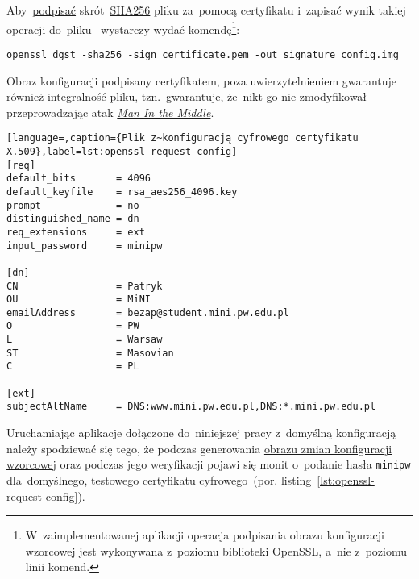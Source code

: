 \documentclass[thesis]{subfiles}
\begin{document}
Aby~\href{http://stackoverflow.com/questions/10782826/digital-signature-for-a-file-using-openssl}{podpisać} skrót~\href{https://en.wikipedia.org/wiki/SHA-2}{SHA256} pliku  za~pomocą certyfikatu  i~zapisać wynik takiej operacji do~pliku~ wystarczy wydać komendę\footnote{W~zaimplementowanej aplikacji operacja podpisania obrazu konfiguracji wzorcowej jest wykonywana z~poziomu biblioteki OpenSSL, a~nie z~poziomu linii komend.}:\mynobreakpar

\begin{center}
	\texttt{openssl dgst -sha256 -sign certificate.pem -out signature config.img}
\end{center}

Obraz konfiguracji podpisany certyfikatem, poza uwierzytelnieniem gwarantuje również integralność pliku, tzn.~gwarantuje, że~nikt go nie zmodyfikował przeprowadzając atak \emph{\hyperlink{itm:mitm}{Man In the Middle}}.

\begin{lstlisting}[language=,caption={Plik z~konfiguracją cyfrowego certyfikatu X.509},label=lst:openssl-request-config]
[req]
default_bits       = 4096
default_keyfile    = rsa_aes256_4096.key
prompt             = no
distinguished_name = dn
req_extensions     = ext
input_password     = minipw

[dn]
CN                 = Patryk
OU                 = MiNI
emailAddress       = bezap@student.mini.pw.edu.pl
O                  = PW
L                  = Warsaw
ST                 = Masovian
C                  = PL

[ext]
subjectAltName     = DNS:www.mini.pw.edu.pl,DNS:*.mini.pw.edu.pl
\end{lstlisting}

Uruchamiając aplikacje dołączone do~niniejszej pracy z~domyślną konfiguracją należy spodziewać się tego, że podczas generowania \hyperref[sec:obraz-zmian-konfiguracji]{obrazu zmian konfiguracji wzorcowej} oraz podczas jego weryfikacji pojawi się monit o~podanie hasła \texttt{minipw} dla~domyślnego, testowego certyfikatu cyfrowego~(por. listing~\ref{lst:openssl-request-config}).
\end{document}
